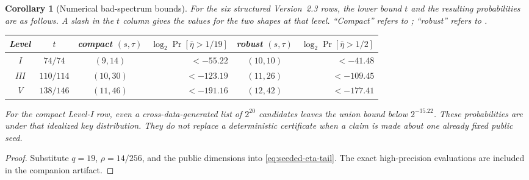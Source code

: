 \documentclass[11pt]{article}
\newtheorem{corollary}[corollary]{Corollary}
\begin{document}
\begin{corollary}[Numerical bad-spectrum bounds]\label{cor:seeded-numerics}
For the six structured Version~2.3 rows, the lower bound $t$ and the resulting
probabilities are as follows.  A slash in the $t$ column gives the values for
the two shapes at that level.  ``Compact'' refers to
; ``robust'' refers to
.

\begin{center}
\small
\begin{tabular}{@{}c c c r c r@{}}
\toprule
Level & $t$ & compact $(s,\tau)$ &
$\log_2\Pr[\bar\eta>1/19]$ & robust $(s,\tau)$ &
$\log_2\Pr[\bar\eta>1/2]$\\
\midrule
I   & $74/74$   & $(9,14)$  & $<-55.22$  & $(10,10)$ & $<-41.48$\\
III & $110/114$ & $(10,30)$ & $<-123.19$ & $(11,26)$ & $<-109.45$\\
V   & $138/146$ & $(11,46)$ & $<-191.16$ & $(12,42)$ & $<-177.41$\\
\bottomrule
\end{tabular}
\end{center}
For the compact Level-I row, even a cross-data-generated list of $2^{20}$
candidates leaves the union bound below $2^{-35.22}$.  These probabilities are
under that idealized key distribution.  They do not replace a deterministic certificate when a
claim is made about one already fixed public seed.
\end{corollary}

\begin{proof}
Substitute $q=19$, $\rho=14/256$, and the public dimensions into
\eqref{eq:seeded-eta-tail}.  The exact high-precision evaluations are included
in the companion artifact.
\end{proof}
\end{document}
